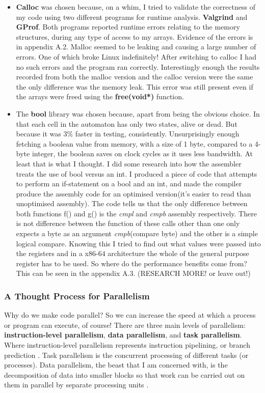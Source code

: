\documentclass[11pt]{article} %
\begin{document}
\begin{itemize}
\item {\bf Calloc} was chosen because, on a whim, I tried to validate the correctness of my code using two different programs for runtime analysis. {\bf Valgrind} and {\bf GProf}. Both programs reported runtime errors relating to the memory structures, during any type of access to my arrays. Evidence of the errors is in appendix A.2. Malloc seemed to be leaking and causing a large number of errors. One of which broke Linux indefinitely! After switching to calloc I had no such errors and the program ran correctly. Interestingly enough the results recorded from both the malloc version and the calloc version were the same the only difference was the memory leak. This error was still present even if the arrays were freed using the {\bf free(void*)} function.
\item The {\bf bool} library was chosen because, apart from being the obvious choice. In that each cell in the automaton has only two states, alive or dead. But because it was 3\% faster in testing, consistently. Unsurprisingly enough fetching a boolean value from memory, with a size of 1 byte, compared to a 4-byte integer, the boolean saves on clock cycles as it uses less bandwidth. At least that is what I thought. I did some research into how the assembler treats the use of bool versus an int. I produced a piece of code that attempts to perform an if-statement on a bool and an int, and made the compiler produce the assembly code for an optimised version(it's easier to read than unoptimised assembly). The code tells us that the only difference between both functions f() and g() is the {\it cmpl} and {\it cmpb} assembly respectively. There is not difference between the function of these calls other than one only expects a byte as an argument {\it cmpb}(compare byte) and the other is a simple logical compare. Knowing this I tried to find out what values were passed into the registers and in a x86-64 architecture the whole of the general purpose register has to be used. So where do the performance benefits come from? This can be seen in the appendix A.3. (RESEARCH MORE! or leave out!)
\end{itemize}
\subsubsection{A Thought Process for Parallelism}
Why do we make code parallel? So we can increase the speed at which a process or program can execute, of course! There are three main levels of parallelism: {\bf instruction-level parallelism}, {\bf data parallelism}, and {\bf task parallelism}. Where instruction-level parallelism represents instruction pipelining, or branch prediction \cite[Patterson, Hennessy, p41]{ref10}. Task parallelism is the concurrent processing of different tasks (or processes). Data parallelism, the beast that I am concerned with, is the decomposition of data into smaller blocks so that work can be carried out on them in parallel by separate processing units \cite[Patterson, Hennessy, A-17]{ref10}.
\end{document}

